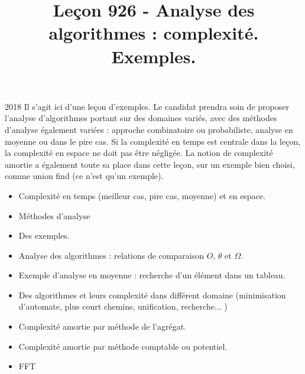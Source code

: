 \documentclass{agregfiche}
\title{Leçon 926 - Analyse des algorithmes : complexité. Exemples.}
\begin{document}
\maketitle

\secrapports
\begin{rapport}{2018}
    Il s’agit ici d’une leçon d’exemples. Le candidat prendra soin de proposer l’analyse d’algorithmes portant
    sur des domaines variés, avec des méthodes d’analyse également variées : approche combinatoire ou
    probabiliste, analyse en moyenne ou dans le pire cas.
    Si la complexité en temps est centrale dans la leçon, la complexité en espace ne doit pas être négligée.
    La notion de complexité amortie a également toute sa place dans cette leçon, sur un exemple bien
    choisi, comme union find (ce n’est qu’un exemple).
\end{rapport}

\secindispensables

\begin{itemize}
        \item Complexité en temps (meilleur cas, pire cas, moyenne)
        et en espace.
	\item Méthodes d'analyse
    \item Des exemples.
\end{itemize}

\secasavoir

\begin{itemize}
	\item Analyse des algorithmes : relations de comparaison $O$, $\theta$ et $\Omega$.
    \item Exemple d’analyse en moyenne : recherche d’un élément dans un tableau.
    \item Des algorithmes et leurs complexité dans différent domaine (minimisation d'automate, plus court chemins, unification, recherche... )
    	\item Complexité amortie par méthode de l'agrégat.

\end{itemize}

\secidees

\begin{itemize}
    	\item Complexité amortie par méthode comptable ou potentiel.
        \item FFT
\end{itemize}

\secpieges
\end{document}
